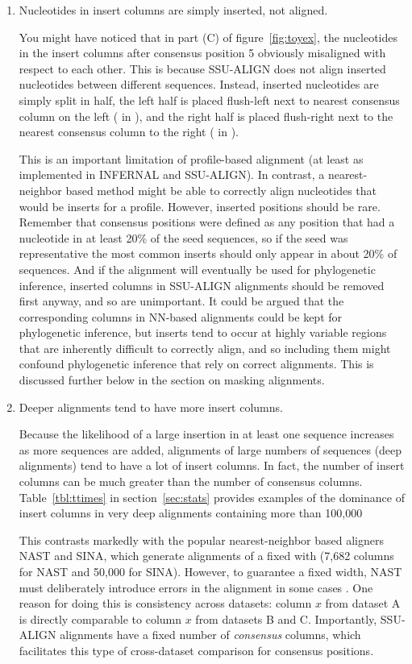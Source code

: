 \begin{enumerate}
\item 
Nucleotides in insert columns are simply inserted, not aligned.

You might have noticed that in part (C) of figure~\ref{fig:toyex}, the
nucleotides in the insert columns after consensus position 5 obviously
misaligned with respect to each other. This is because SSU-ALIGN
does not align inserted nucleotides between different
sequences. Instead, inserted nucleotides are simply split in half, the
left half is placed flush-left next to nearest consensus column on the
left ( in ), and the right half is placed
flush-right next to the nearest consensus column to the right
( in ). 

This is an important limitation of
profile-based alignment (at least as implemented in INFERNAL and
SSU-ALIGN). In contrast, a nearest-neighbor based method might
be able to correctly align nucleotides that would be inserts for a
profile. However, inserted positions should be rare. Remember that
consensus positions were defined as any position that had a nucleotide
in at least 20\% of the seed sequences, so if the seed was
representative the most common inserts should only appear in about
20\% of sequences. And if the alignment will eventually be used for
phylogenetic inference, inserted columns in SSU-ALIGN alignments
should be removed first anyway, and so are unimportant. 
It could be argued that the corresponding columns in NN-based
alignments could be kept for phylogenetic inference, but inserts tend
to occur at highly variable regions that are inherently difficult to
correctly align, and so including them might confound phylogenetic
inference that rely on correct alignments. This is
discussed further below in the section on masking alignments.

\item 
Deeper alignments tend to have more insert columns. 

Because the likelihood of a large insertion in at least one sequence
increases as more sequences are added, alignments of large numbers of
sequences (deep alignments) tend to have a lot of insert columns. In
fact, the number of insert columns can be much greater than the number
of consensus columns. Table~\ref{tbl:ttimes} in
section~\ref{sec:stats} provides examples of the dominance of insert
columns in very deep alignments containing more than 100,000

This contrasts markedly with the popular nearest-neighbor based
aligners NAST and SINA, which generate alignments of a
fixed with (7,682 columns for NAST and 50,000 for
SINA). However, to guarantee a fixed width, NAST must
deliberately introduce errors in the alignment in some cases
\cite{DeSantis06}. One reason for doing this is consistency across
datasets: column $x$ from dataset A is directly comparable to column
$x$ from datasets B and C. Importantly, SSU-ALIGN alignments
have a fixed number of \emph{consensus} columns, which facilitates this
type of cross-dataset comparison for consensus positions.
\end{enumerate} 

